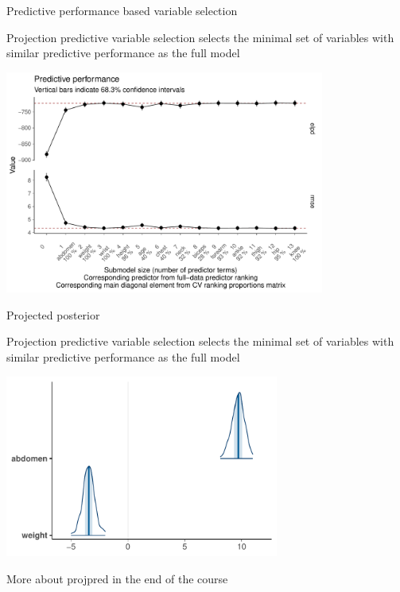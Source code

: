 \documentclass[english,t]{beamer}
\begin{document}
\begin{frame}{Predictive performance based variable selection}

  \vspace{-0.75\baselineskip}
  Projection predictive variable selection selects the minimal set of
  variables with similar predictive performance as the full model
  
  \vspace{-0.5\baselineskip}
  \includegraphics[width=10.5cm]{bodyfat_vsel.pdf}

\end{frame}

\begin{frame}{Projected posterior}

  \vspace{-0.75\baselineskip}
  Projection predictive variable selection selects the minimal set of
  variables with similar predictive performance as the full model
  
  \includegraphics[width=9cm]{bodyfat_projected.pdf}

  {\footnotesize More about projpred in the end of the course}

\end{frame}
\end{document}
